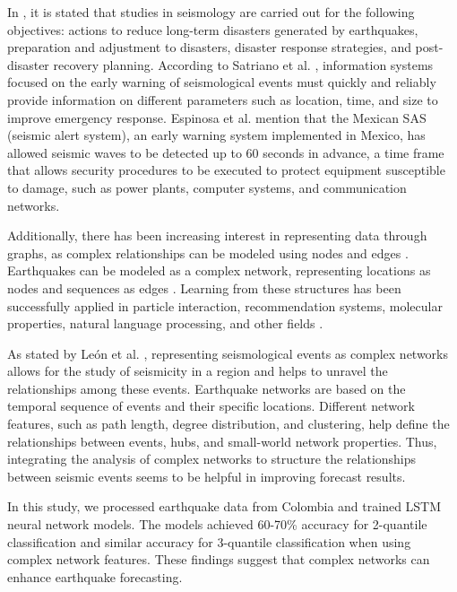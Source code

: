 \documentclass[sn-mathphys-num]{sn-jnl}
\begin{document}
In \cite{jiao_artificial_2020}, it is stated that studies in seismology are carried out for the following objectives: actions to reduce long-term disasters generated by earthquakes, preparation and adjustment to disasters, disaster response strategies, and post-disaster recovery planning. According to Satriano et al. \cite{satriano_earthquake_2011}, information systems focused on the early warning of seismological events must quickly and reliably provide information on different parameters such as location, time, and size to improve emergency response. Espinosa et al. \cite{espinosa-aranda_evolution_2009} mention that the Mexican SAS (seismic alert system), an early warning system implemented in Mexico, has allowed seismic waves to be detected up to 60 seconds in advance, a time frame that allows security procedures to be executed to protect equipment susceptible to damage, such as power plants, computer systems, and communication networks.

Additionally, there has been increasing interest in representing data through graphs, as complex relationships can be modeled using nodes and edges \cite{chami_machine_2021}. Earthquakes can be modeled as a complex network, representing locations as nodes and sequences as edges \cite{leon_modeling_2018}. Learning from these structures has been successfully applied in particle interaction, recommendation systems, molecular properties, natural language processing, and other fields \cite{grattarola_graph_2020}.

As stated by León et al. \cite{leon_modeling_2018}, representing seismological events as complex networks allows for the study of seismicity in a region and helps to unravel the relationships among these events. Earthquake networks are based on the temporal sequence of events and their specific locations. Different network features, such as path length, degree distribution, and clustering, help define the relationships between events, hubs, and small-world network properties. Thus, integrating the analysis of complex networks to structure the relationships between seismic events seems to be helpful in improving forecast results.

In this study, we processed earthquake data from Colombia and trained LSTM neural network models. The models achieved 60-70\% accuracy for 2-quantile classification and similar accuracy for 3-quantile classification when using complex network features. These findings suggest that complex networks can enhance earthquake forecasting. 
\end{document}
